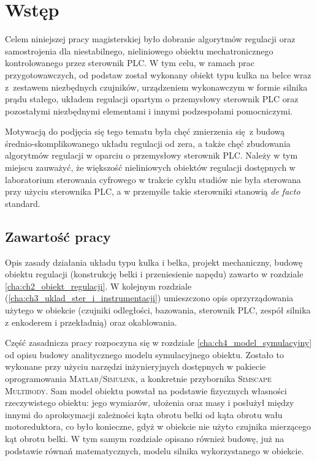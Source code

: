 \chapter{Wstęp}
\label{cha:ch1_wstep}

Celem niniejszej pracy magisterskiej było dobranie algorytmów regulacji oraz samostrojenia dla niestabilnego, nieliniowego obiektu mechatronicznego kontrolowanego przez sterownik PLC. W tym celu, w ramach prac przygotowawczych, od podstaw został wykonany obiekt typu kulka na belce wraz z~zestawem niezbędnych czujników, urządzeniem wykonawczym w formie silnika prądu stałego, układem regulacji opartym o przemysłowy sterownik PLC oraz pozostałymi niezbędnymi elementami i innymi podzespołami pomocniczymi.

Motywacją do podjęcia się tego tematu była chęć zmierzenia się z budową średnio-skomplikowanego układu regulacji od zera, a także chęć zbudowania algorytmów regulacji w oparciu o przemysłowy sterownik PLC. Należy w tym miejscu zauważyć, że większość nieliniowych obiektów regulacji dostępnych w laboratorium sterowania cyfrowego w trakcie cyklu studiów nie była sterowana przy użyciu sterownika PLC, a w przemyśle takie sterowniki stanowią \textit{de facto} standard.


\section{Zawartość pracy}

Opis zasady działania układu typu kulka i belka, projekt mechaniczny, budowę obiektu regulacji (konstrukcję belki i przeniesienie napędu) zawarto w rozdziale \ref{cha:ch2_obiekt_regulacji}. W kolejnym rozdziale (\ref{cha:ch3_uklad_ster_i_instrumentacji}) umieszczono opis oprzyrządowania użytego w obiekcie (czujniki odległości, bazowania, sterownik PLC, zespół silnika z enkoderem i przekładnią) oraz okablowania.

Część zasadnicza pracy rozpoczyna się w rozdziale \ref{cha:ch4_model_symulacyjny} od opisu budowy analitycznego modelu symulacyjnego obiektu. Zostało to wykonane przy użyciu narzędzi inżynieryjnych dostępnych w pakiecie oprogramowania \textsc{Matlab/Simulink}, a konkretnie przybornika \textsc{Simscape Multibody}. Sam model obiektu powstał na podstawie fizycznych własności rzeczywistego obiektu: jego wymiarów, ułożenia oraz masy i posłużył między innymi do aproksymacji zależności kąta obrotu belki od kąta obrotu wału motoreduktora, co było konieczne, gdyż w obiekcie nie użyto czujnika mierzącego kąt obrotu belki. W tym samym rozdziale opisano również budowę, już na podstawie równań matematycznych, modelu silnika wykorzystanego w obiekcie.

